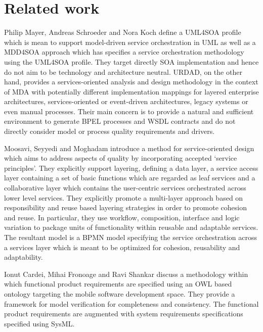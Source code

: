 \section{Related work}
\label{sec:relatedWork}

Philip Mayer, Andreas Schroeder and Nora Koch\cite{mayer_mdd4soa:_2008} define a UML4SOA profile which is mean to support model-driven service orchestration in UML as well as a MDD4SOA approach which has specifies a service orchestration methodology using the UML4SOA profile. They target directly SOA implementation and hence do not aim to be technology and architecture neutral. URDAD, on the other hand, provides a services-oriented analysis and design methodology in the context of MDA with potentially different implementation mappings for layered enterprise architectures, services-oriented or event-driven architectures, legacy systems or even manual processes. Their main concern is to provide a natural and sufficient environment to generate BPEL processes and WSDL contracts and do not directly consider model or process quality requirements and drivers.

Moosavi, Seyyedi and Moghadam\cite{moosavi_method_2009} introduce a method for service-oriented design which aims to address aspects of quality by incorporating accepted `service principles'. They explicitly support layering, defining a data layer, a service access layer containing a set of basic functions which are regarded as leaf services and a collaborative layer which contains the user-centric services orchestrated across lower level services. They explicitly promote a multi-layer approach based on responsibility and reuse based layering strategies in order to promote cohesion and reuse. In particular, they use workflow, composition, interface and logic variation to package units of functionality within reusable and adaptable services. The resultant model is a BPMN model specifying the service orchestration across a services layer which is meant to be optimized for cohesion, reusability and adaptability.

Ionut Cardei, Mihai Fronoage and Ravi Shankar\cite{cardei_model_2008} discuss a methodology within which functional product requirements are specified using an OWL based ontology targeting the mobile software development space. They provide a framework for model verification for completeness and consistency. The functional product requirements are augmented with system requirements specifications specified using SysML.